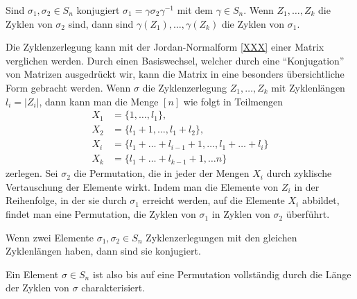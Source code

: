 \begin{satz}
Sind $\sigma_1,\sigma_2\in S_n$ konjugiert $\sigma_1=\gamma\sigma_2\gamma^{-1}$
mit dem $\gamma\in S_n$.
Wenn $Z_1,\dots,Z_k$ die Zyklen von $\sigma_2$ sind, dann sind 
$\gamma(Z_1),\dots,\gamma(Z_k)$ die Zyklen von $\sigma_1$.
\end{satz}

Die Zyklenzerlegung kann mit der Jordan-Normalform \ref{XXX}
einer Matrix verglichen werden.
Durch einen Basiswechsel, welcher durch eine ``Konjugation''
von Matrizen ausgedrückt wir, kann die Matrix in eine besonders 
übersichtliche Form gebracht werden.
Wenn $\sigma$ die Zyklenzerlegung $Z_1,\dots,Z_k$ mit Zyklenlängen
$l_i=|Z_i|$, dann kann man die Menge $[n]$ wie folgt in Teilmengen
\begin{align*}
X_1 &= \{1,\dots, l_1\},
\\
X_2 &= \{l_1+1,\dots,l_1+l_2\},
\\
X_i &= \{l_1+\dots+l_{i-1}+1,\dots, l_1+\dots+l_i\}
\\
X_k &= \{l_1+\dots+l_{k-1}+1,\dots n\}
\end{align*}
zerlegen.
Sei $\sigma_2$ die Permutation, die in jeder der Mengen $X_i$ durch
zyklische Vertauschung der Elemente wirkt.
Indem man die Elemente von $Z_i$ in der Reihenfolge, in der sie durch
$\sigma_1$ erreicht werden, auf die Elemente $X_i$ abbildet, findet
man eine Permutation, die Zyklen von $\sigma_1$ in Zyklen von $\sigma_2$
überführt.

\begin{satz}
Wenn zwei Elemente $\sigma_1,\sigma_2\in S_n$ Zyklenzerlegungen mit den
gleichen Zyklenlängen haben, dann sind sie konjugiert.
\end{satz}

Ein Element $\sigma\in S_n$ ist also bis auf eine Permutation
vollständig durch die Länge der Zyklen von $\sigma$ charakterisiert.


